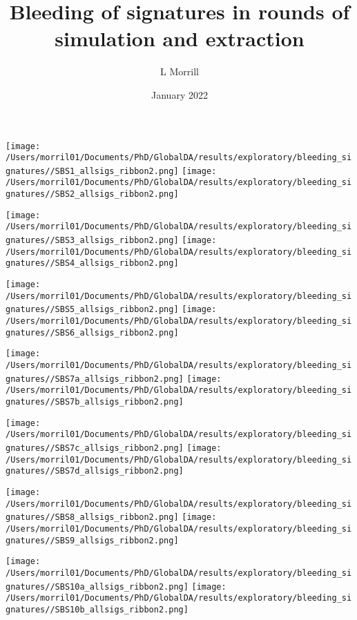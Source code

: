 \documentclass{article}
\title{Bleeding of signatures in rounds of simulation and extraction}
\author{L Morrill}
\date{January 2022}
\begin{document}
\maketitle


\hspace{-1in}\texttt{[image: /Users/morril01/Documents/PhD/GlobalDA/results/exploratory/bleeding\_signatures//SBS1\_allsigs\_ribbon2.png]} \texttt{[image: /Users/morril01/Documents/PhD/GlobalDA/results/exploratory/bleeding\_signatures//SBS2\_allsigs\_ribbon2.png]}

\hspace{-1in}\texttt{[image: /Users/morril01/Documents/PhD/GlobalDA/results/exploratory/bleeding\_signatures//SBS3\_allsigs\_ribbon2.png]}
\texttt{[image: /Users/morril01/Documents/PhD/GlobalDA/results/exploratory/bleeding\_signatures//SBS4\_allsigs\_ribbon2.png]}
 
 \hspace{-1in}\texttt{[image: /Users/morril01/Documents/PhD/GlobalDA/results/exploratory/bleeding\_signatures//SBS5\_allsigs\_ribbon2.png]}
\texttt{[image: /Users/morril01/Documents/PhD/GlobalDA/results/exploratory/bleeding\_signatures//SBS6\_allsigs\_ribbon2.png]} 

\hspace{-1in}\texttt{[image: /Users/morril01/Documents/PhD/GlobalDA/results/exploratory/bleeding\_signatures//SBS7a\_allsigs\_ribbon2.png]} 
 \texttt{[image: /Users/morril01/Documents/PhD/GlobalDA/results/exploratory/bleeding\_signatures//SBS7b\_allsigs\_ribbon2.png]} 
 
 \hspace{-1in}\texttt{[image: /Users/morril01/Documents/PhD/GlobalDA/results/exploratory/bleeding\_signatures//SBS7c\_allsigs\_ribbon2.png]} \texttt{[image: /Users/morril01/Documents/PhD/GlobalDA/results/exploratory/bleeding\_signatures//SBS7d\_allsigs\_ribbon2.png]} 
 
 \hspace{-1in}\texttt{[image: /Users/morril01/Documents/PhD/GlobalDA/results/exploratory/bleeding\_signatures//SBS8\_allsigs\_ribbon2.png]}
\texttt{[image: /Users/morril01/Documents/PhD/GlobalDA/results/exploratory/bleeding\_signatures//SBS9\_allsigs\_ribbon2.png]}

\hspace{-1in} \texttt{[image: /Users/morril01/Documents/PhD/GlobalDA/results/exploratory/bleeding\_signatures//SBS10a\_allsigs\_ribbon2.png]} \texttt{[image: /Users/morril01/Documents/PhD/GlobalDA/results/exploratory/bleeding\_signatures//SBS10b\_allsigs\_ribbon2.png]} 
\end{document}
